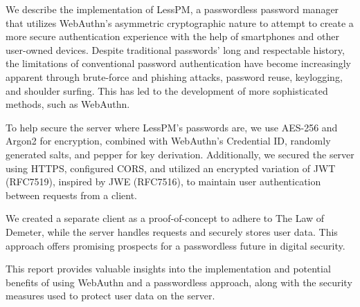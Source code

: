 We describe the implementation of LessPM, a passwordless password manager that
utilizes WebAuthn's asymmetric cryptographic nature to attempt to create a more
secure authentication experience with the help of smartphones and other
user-owned devices.
Despite traditional passwords' long and respectable history, the limitations of
conventional password authentication have become increasingly apparent through
brute-force and phishing attacks, password reuse, keylogging, and shoulder
surfing.
This has led to the development of more sophisticated methods, such as WebAuthn.

To help secure the server where LessPM's passwords are, we use AES-256 and
Argon2 for encryption, combined with WebAuthn's Credential ID, randomly
generated salts, and pepper for key derivation.
Additionally, we secured the server using HTTPS, configured CORS, and utilized
an encrypted variation of JWT (RFC7519), inspired by JWE (RFC7516), to maintain
user authentication between requests from a client.

We created a separate client as a proof-of-concept to adhere to The Law of
Demeter, while the server handles requests and securely stores user data.
This approach offers promising prospects for a passwordless future in digital
security.

This report provides valuable insights into the implementation and potential
benefits of using WebAuthn and a passwordless approach, along with the security
measures used to protect user data on the server.